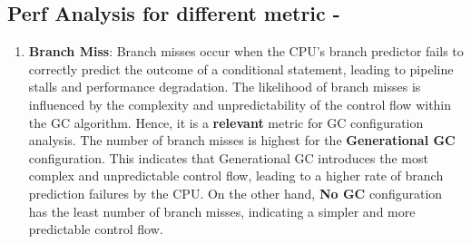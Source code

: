 \documentclass[11pt,paper=a4,answers]{exam}
\begin{document}
\subsection*{Perf Analysis for different metric -}
\begin{enumerate}
    \item \textbf{Branch Miss}: Branch misses occur when the CPU's branch predictor fails to correctly predict the outcome of a conditional statement, leading to pipeline stalls and performance degradation. The likelihood of branch misses is influenced by the complexity and unpredictability of the control flow within the GC algorithm. Hence, it is a \textbf{relevant} metric for GC configuration analysis.
    \vspace{1mm}
    \newline
    The number of branch misses is highest for the \textbf{Generational GC} configuration. This indicates that Generational GC introduces the most complex and unpredictable control flow, leading to a higher rate of branch prediction failures by the CPU.
    \vspace{1mm}
    \newline 
    On the other hand, \textbf{No GC} configuration has the least number of branch misses, indicating a simpler and more predictable control flow.


\end{enumerate}
\end{document}
